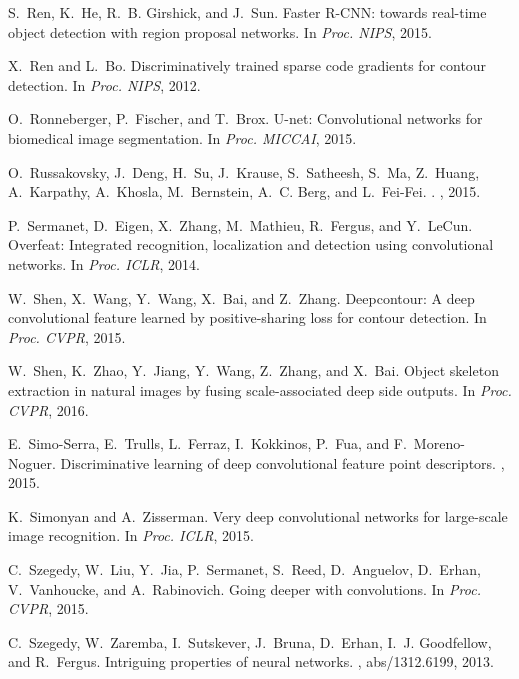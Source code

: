 \documentclass[10pt,twocolumn,letterpaper]{article}
\begin{document}
\begin{thebibliography}{100}
	S.~Ren, K.~He, R.~B. Girshick, and J.~Sun.
	\newblock Faster {R-CNN:} towards real-time object detection with region
	proposal networks.
	\newblock In {\em Proc. {NIPS}}, 2015.
	
	X.~Ren and L.~Bo.
	\newblock Discriminatively trained sparse code gradients for contour detection.
	\newblock In {\em Proc. {NIPS}}, 2012.
	
	O.~Ronneberger, P.~Fischer, and T.~Brox.
	\newblock U-net: Convolutional networks for biomedical image segmentation.
	\newblock In {\em Proc. MICCAI}, 2015.
	
	O.~Russakovsky, J.~Deng, H.~Su, J.~Krause, S.~Satheesh, S.~Ma, Z.~Huang,
	A.~Karpathy, A.~Khosla, M.~Bernstein, A.~C. Berg, and L.~Fei-Fei.
	.
	, 2015.
	
	P.~Sermanet, D.~Eigen, X.~Zhang, M.~Mathieu, R.~Fergus, and Y.~LeCun.
	\newblock Overfeat: Integrated recognition, localization and detection using
	convolutional networks.
	\newblock In {\em Proc. {ICLR}}, 2014.
	
	W.~Shen, X.~Wang, Y.~Wang, X.~Bai, and Z.~Zhang.
	\newblock Deepcontour: A deep convolutional feature learned by positive-sharing
	loss for contour detection.
	\newblock In {\em Proc. {CVPR}}, 2015.
	
	W.~Shen, K.~Zhao, Y.~Jiang, Y.~Wang, Z.~Zhang, and X.~Bai.
	\newblock Object skeleton extraction in natural images by fusing
	scale-associated deep side outputs.
	\newblock In {\em Proc. {CVPR}}, 2016.
	
	E.~Simo-Serra, E.~Trulls, L.~Ferraz, I.~Kokkinos, P.~Fua, and F.~Moreno-Noguer.
	\newblock Discriminative learning of deep convolutional feature point
	descriptors.
	, 2015.
	
	K.~Simonyan and A.~Zisserman.
	\newblock Very deep convolutional networks for large-scale image recognition.
	\newblock In {\em Proc. {ICLR}}, 2015.
	
	C.~Szegedy, W.~Liu, Y.~Jia, P.~Sermanet, S.~Reed, D.~Anguelov, D.~Erhan,
	V.~Vanhoucke, and A.~Rabinovich.
	\newblock Going deeper with convolutions.
	\newblock In {\em Proc. {CVPR}}, 2015.
	
	C.~Szegedy, W.~Zaremba, I.~Sutskever, J.~Bruna, D.~Erhan, I.~J. Goodfellow, and
	R.~Fergus.
	\newblock Intriguing properties of neural networks.
	, abs/1312.6199, 2013.
	

\end{thebibliography}
\end{document}
